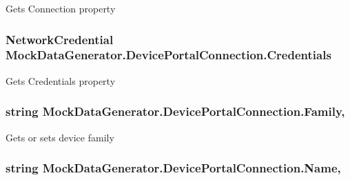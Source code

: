 Gets Connection property 

\subsubsection[{\texorpdfstring{Credentials}{Credentials}}]{\setlength{\rightskip}{0pt plus 5cm}Network\+Credential Mock\+Data\+Generator.\+Device\+Portal\+Connection.\+Credentials\hspace{0.3cm}{\ttfamily [get]}}\hypertarget{class_mock_data_generator_1_1_device_portal_connection_a4b2457f7f387ed972ef9fa0972b93620}{}\label{class_mock_data_generator_1_1_device_portal_connection_a4b2457f7f387ed972ef9fa0972b93620}


Gets Credentials property 

\subsubsection[{\texorpdfstring{Family}{Family}}]{\setlength{\rightskip}{0pt plus 5cm}string Mock\+Data\+Generator.\+Device\+Portal\+Connection.\+Family\hspace{0.3cm}{\ttfamily [get]}, {\ttfamily [set]}}\hypertarget{class_mock_data_generator_1_1_device_portal_connection_a935715a8687237215e1e02816a4d462f}{}\label{class_mock_data_generator_1_1_device_portal_connection_a935715a8687237215e1e02816a4d462f}


Gets or sets device family 

\subsubsection[{\texorpdfstring{Name}{Name}}]{\setlength{\rightskip}{0pt plus 5cm}string Mock\+Data\+Generator.\+Device\+Portal\+Connection.\+Name\hspace{0.3cm}{\ttfamily [get]}, {\ttfamily [set]}}\hypertarget{class_mock_data_generator_1_1_device_portal_connection_acbc0ae9350c1884781fa94c9db7a51d6}{}\label{class_mock_data_generator_1_1_device_portal_connection_acbc0ae9350c1884781fa94c9db7a51d6}


